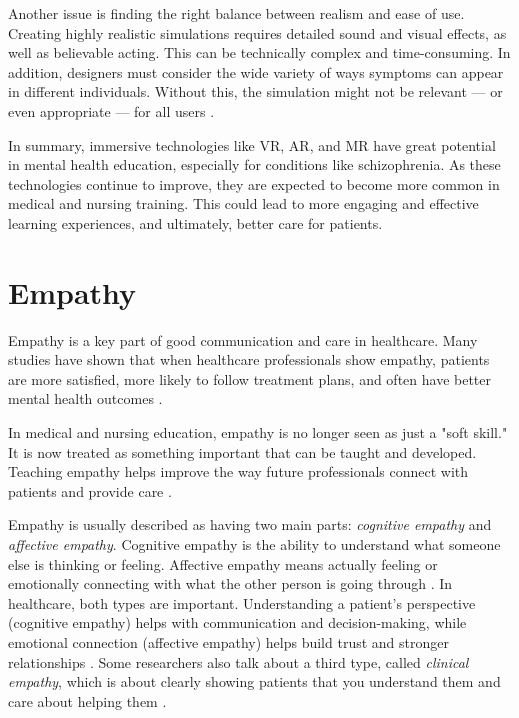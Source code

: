 Another issue is finding the right balance between realism and ease of use. Creating highly realistic simulations requires detailed sound and visual effects, as well as believable acting. This can be technically complex and time-consuming. In addition, designers must consider the wide variety of ways symptoms can appear in different individuals. Without this, the simulation might not be relevant — or even appropriate — for all users \cite{Zare-Bidaki2022}.

In summary, immersive technologies like VR, AR, and MR have great potential in mental health education, especially for conditions like schizophrenia. As these technologies continue to improve, they are expected to become more common in medical and nursing training. This could lead to more engaging and effective learning experiences, and ultimately, better care for patients.

\section{Empathy}

Empathy is a key part of good communication and care in healthcare. Many studies have shown that when healthcare professionals show empathy, patients are more satisfied, more likely to follow treatment plans, and often have better mental health outcomes \cite{Cunico2012, Olson1995, Ozcan2018}.

In medical and nursing education, empathy is no longer seen as just a "soft skill." It is now treated as something important that can be taught and developed. Teaching empathy helps improve the way future professionals connect with patients and provide care \cite{Cunico2012}.

Empathy is usually described as having two main parts: \textit{cognitive empathy} and \textit{affective empathy}. Cognitive empathy is the ability to understand what someone else is thinking or feeling. Affective empathy means actually feeling or emotionally connecting with what the other person is going through \cite{Ventura2020, Martingano2021}. In healthcare, both types are important. Understanding a patient's perspective (cognitive empathy) helps with communication and decision-making, while emotional connection (affective empathy) helps build trust and stronger relationships \cite{Cunico2012, Ozcan2018}. Some researchers also talk about a third type, called \textit{clinical empathy}, which is about clearly showing patients that you understand them and care about helping them \cite{Hojat2002}.

